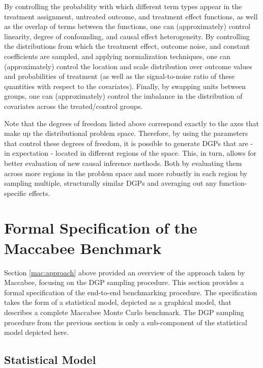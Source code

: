 \documentclass[../main.tex]{subfiles}
\begin{document}
By controlling the probability with which different term types appear in the treatment assignment, untreated outcome, and treatment effect functions, as well as the overlap of terms between the functions, one can (approximately) control linearity, degree of confounding, and causal effect heterogeneity. By controlling the distributions from which the treatment effect, outcome noise, and constant coefficients are sampled, and applying normalization techniques, one can (approximately) control the location and scale distribution over outcome values and probabilities of treatment (as well as the signal-to-noise ratio of these quantities with respect to the covariates). Finally, by swapping units between groups, one can (approximately) control the imbalance in the distribution of covariates across the treated/control groups.

\vspace{\baselineskip}

Note that the degrees of freedom listed above correspond exactly to the axes that make up the distributional problem space. Therefore, by using the parameters that control these degrees of freedom, it is possible to generate DGPs that are - in expectation - located in different regions of the space. This, in turn, allows for better evaluation of new causal inference methods. Both by evaluating them across more regions in the problem space and more robustly in each region by sampling multiple, structurally similar DGPs and averaging out any function-specific effects.

\section{Formal Specification of the Maccabee Benchmark}
\label{mac:formalspec}

Section \ref{mac:approach} above provided an overview of the approach taken by Maccabee, focusing on the DGP sampling procedure. This section provides a formal specification of the end-to-end benchmarking procedure. The specification takes the form of a statistical model, depicted as a graphical model, that describes a complete Maccabee Monte Carlo benchmark. The DGP sampling procedure from the previous section is only a sub-component of the statistical model depicted here.

\subsection{Statistical Model}
\end{document}
